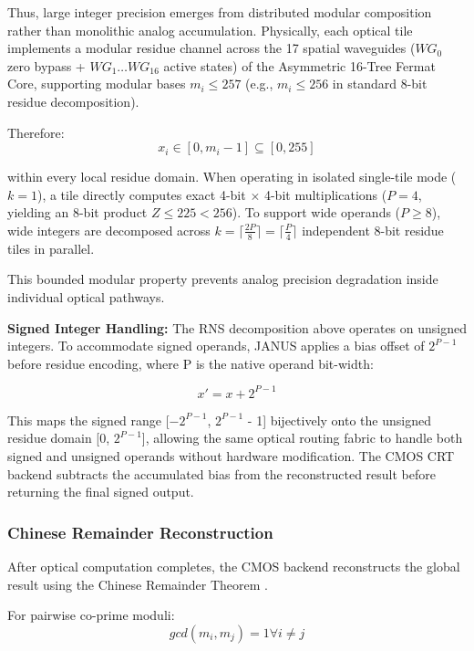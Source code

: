 \documentclass[journal]{IEEEtran}
\begin{document}
Thus, large integer precision emerges from distributed modular composition rather than monolithic analog accumulation. Physically, each optical tile implements a modular residue channel across the 17 spatial waveguides ($WG_0$ zero bypass + $WG_1\dots WG_{16}$ active states) of the Asymmetric 16-Tree Fermat Core, supporting modular bases $m_i \le 257$ (e.g., $m_i \le 256$ in standard 8-bit residue decomposition).

Therefore:
\begin{equation}
x_i \in [0, m_i - 1] \subseteq [0, 255]
\end{equation}

within every local residue domain. When operating in isolated single-tile mode ($k=1$), a tile directly computes exact 4-bit $\times$ 4-bit multiplications ($P=4$, yielding an 8-bit product $Z \le 225 < 256$). To support wide operands ($P \ge 8$), wide integers are decomposed across $k = \lceil \frac{2P}{8} \rceil = \lceil \frac{P}{4} \rceil$ independent 8-bit residue tiles in parallel.

This bounded modular property prevents analog precision degradation inside individual optical pathways.

\textbf{Signed Integer Handling:} The RNS decomposition above operates on unsigned integers. To accommodate signed
operands, JANUS applies a bias offset of $2^{P -1}$ before residue encoding, where P is the native operand bit-width:

\begin{equation}
x' = x + 2^{P -1}
\end{equation}

This maps the signed range [$-2^{P -1}$, $2^{P -1}$ - 1] bijectively onto the unsigned residue domain [0, $2^{P - 1}$], allowing the same optical routing fabric to handle both signed and unsigned operands without hardware modification. The CMOS CRT backend subtracts the accumulated bias from the reconstructed result before returning the final signed output.

\subsubsection{\textbf{Chinese Remainder Reconstruction}}

After optical computation completes, the CMOS backend reconstructs the global result using the Chinese Remainder Theorem \cite{Mohan2016}\cite{Wang2000}\cite{Xia2000}.

For pairwise co-prime moduli:
\begin{equation}
gcd(m_i, m_j) = 1 \forall i \neq  j
\end{equation}
\end{document}
